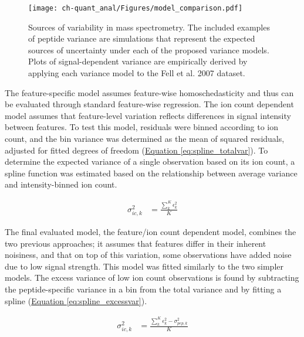 \begin{figure}[h!]
\begin{center}
\texttt{[image: ch-quant\_anal/Figures/model\_comparison.pdf]}
\caption[Sources of variability in mass spectrometry]{Sources of variability in mass spectrometry. The included examples of peptide variance are simulations that represent the expected sources of uncertainty under each of the proposed variance models. Plots of signal-dependent variance are empirically derived by applying each variance model to the Fell et al. 2007 dataset.}
\label{ch-quant_anal:modelComparison}
\end{center}
\end{figure}

The feature-specific model assumes feature-wise homoschedasticity and thus can be evaluated through standard feature-wise regression. The ion count dependent model assumes that feature-level variation reflects differences in signal intensity between features. To test this model, residuals were binned according to ion count, and the bin variance was determined as the mean of squared residuals, adjusted for fitted degrees of freedom (\hyperref[eq:spline_totalvar]{Equation \ref{eq:spline_totalvar}}). To determine the expected variance of a single observation based on its ion count, a spline function was estimated based on the relationship between average variance and intensity-binned ion count.

\begin{align}
\sigma^{2}_{ic,k} &= \frac{\sum_{k}^{K}\epsilon_{k}^{2}}{K}\label{eq:spline_totalvar}
\end{align}

The final evaluated model, the feature/ion count dependent model, combines the two previous approaches; it assumes that features differ in their inherent noisiness, and that on top of this variation, some observations have added noise due to low signal strength. This model was fitted similarly to the two simpler models. The excess variance of low ion count observations is found by subtracting the peptide-specific variance in a bin from the total variance and by fitting a spline (\hyperref[eq:spline_excessvar]{Equation \ref{eq:spline_excessvar}}).

\begin{align}
\sigma^{2}_{ic,k} &= \frac{\sum_{k}^{K}\epsilon_{k}^{2} - \sigma^{2}_{pep,k}}{K}\label{eq:spline_excessvar}
\end{align}

